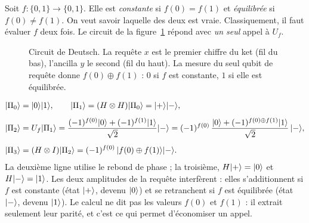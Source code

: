 Soit $f:\{0,1\}\to\{0,1\}$. Elle est \emph{constante} si $f(0)=f(1)$ et \emph{équilibrée} si
$f(0)\neq f(1)$. On veut savoir laquelle des deux est vraie. Classiquement, il faut évaluer $f$ deux
fois. Le circuit de la figure~\ref{fig:deutsch} répond avec \emph{un seul} appel à $U_f$.

\begin{figure}[!ht]
\centering
{}
\caption{Circuit de Deutsch. La requête $x$ est le premier chiffre du ket (fil du bas), l'ancilla
$y$ le second (fil du haut). La mesure du seul qubit de requête donne $f(0)\oplus f(1)$ : $0$ si $f$ est
constante, $1$ si elle est équilibrée.}
\label{fig:deutsch}
\end{figure}

\begin{align*}
  |\Pi_0\rangle&=|0\rangle|1\rangle,\qquad
  |\Pi_1\rangle=(H\otimes H)|\Pi_0\rangle=|+\rangle|-\rangle,\\[1ex]
  |\Pi_2\rangle&=U_f|\Pi_1\rangle
    =\frac{(-1)^{f(0)}|0\rangle+(-1)^{f(1)}|1\rangle}{\sqrt2}|-\rangle
    =(-1)^{f(0)}\,\frac{|0\rangle+(-1)^{f(0)\oplus f(1)}|1\rangle}{\sqrt2}\,|-\rangle,\\[1ex]
  |\Pi_3\rangle&=(H\otimes I)|\Pi_2\rangle=(-1)^{f(0)}\,|f(0)\oplus f(1)\rangle|-\rangle.
\end{align*}
La deuxième ligne utilise le rebond de phase ; la troisième, $H|+\rangle=|0\rangle$ et $H|-\rangle=|1\rangle$.
Les deux amplitudes de la requête interfèrent : elles s'additionnent si $f$ est constante (état
$|+\rangle$, devenu $|0\rangle$) et se retranchent si $f$ est équilibrée (état $|-\rangle$, devenu $|1\rangle$).
Le calcul ne dit pas les valeurs $f(0)$ et $f(1)$ : il extrait seulement leur parité, et c'est ce qui
permet d'économiser un appel.


